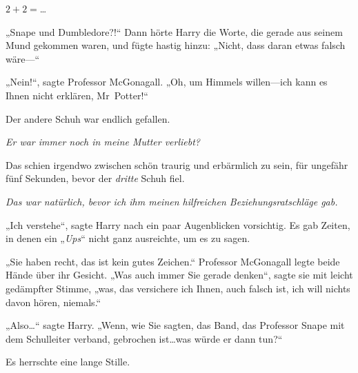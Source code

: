 $2 + 2 = $…

„Snape und Dumbledore?!“
Dann hörte Harry die Worte, die gerade aus seinem Mund gekommen waren, und fügte hastig hinzu: „Nicht, dass daran etwas falsch wäre—“

„Nein!“, sagte Professor McGonagall. „Oh, um Himmels willen—ich kann es Ihnen nicht erklären, Mr~Potter!“

Der andere Schuh war endlich gefallen.

\emph{Er war immer noch in meine Mutter verliebt?}

Das schien irgendwo zwischen schön traurig und erbärmlich zu sein, für ungefähr fünf Sekunden, bevor der \emph{dritte} Schuh fiel.

\emph{Das war natürlich, bevor ich ihm meinen hilfreichen Beziehungsratschläge gab.}

„Ich verstehe“, sagte Harry nach ein paar Augenblicken vorsichtig. Es gab Zeiten, in denen ein „\emph{Ups}“ nicht ganz ausreichte, um es zu sagen.

„Sie haben recht, das ist kein gutes Zeichen.“ Professor McGonagall legte beide Hände über ihr Gesicht. „Was auch immer Sie gerade denken“, sagte sie mit leicht gedämpfter Stimme, „was, das versichere ich Ihnen, auch falsch ist, ich will nichts davon hören, niemals.“

„Also…“ sagte Harry. „Wenn, wie Sie sagten, das Band, das Professor Snape mit dem Schulleiter verband, gebrochen ist…was würde er dann tun?“

Es herrschte eine lange Stille.


